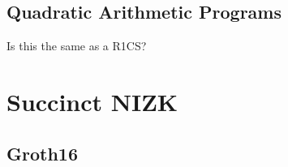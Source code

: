 \subsection{Quadratic Arithmetic Programs}
Is this the same as a R1CS? 

\section{Succinct NIZK}
\subsection{Groth16}

